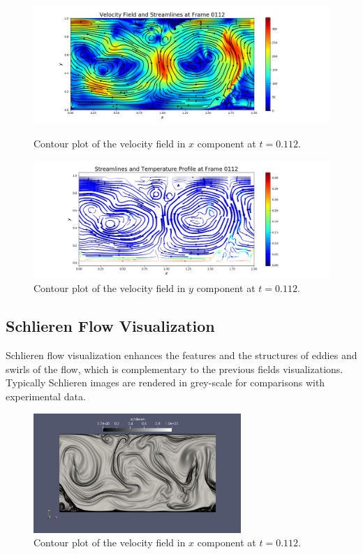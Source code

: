 \documentclass[11pt]{article} %
\begin{document}
\begin{figure}[h!]
\centering
\hspace*{-0.25in}
\includegraphics[width=1.2\textwidth]{streamline_regular.png}
\caption{Contour plot of the velocity field in $x$ component at $t=0.112$.}
\hspace*{-0.25in}
\includegraphics[width=1.2\textwidth]{streamline.png}
\caption{Contour plot of the velocity field in $y$ component at $t=0.112$.}
\end{figure}
\newpage

\subsection{Schlieren Flow Visualization}
Schlieren flow visualization enhances the features and the structures of eddies and swirls of the flow, which is complementary to the previous fields visualizations. Typically Schlieren images are rendered in grey-scale for comparisons with experimental data.  
\begin{figure}[h!]
\centering
\includegraphics[width=0.7\textwidth]{schlierin_grey.png}
\caption{Contour plot of the velocity field in $x$ component at $t=0.112$.}
\end{figure}
\end{document}
